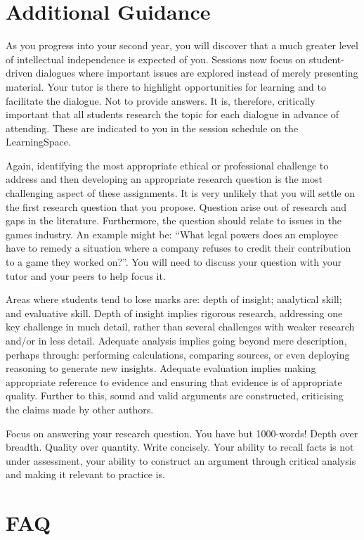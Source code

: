 \documentclass{../fal_assignment}
\begin{document}
\section*{Additional Guidance}

As you progress into your second year, you will discover that a much greater level of intellectual independence is expected of you. Sessions now focus on student-driven dialogues where important issues are explored instead of merely presenting material. Your tutor is there to highlight opportunities for learning and to facilitate the dialogue. Not to provide answers. It is, therefore, critically important that all students research the topic for each dialogue in advance of attending. These are indicated to you in the session schedule on the LearningSpace.

Again, identifying the most appropriate ethical or professional challenge to address and then developing an appropriate research question is the most challenging aspect of these assignments. It is very unlikely that you will settle on the first research question that you propose. Question arise out of research and gaps in the literature. Furthermore, the question should relate to issues in the games industry. An example might be: ``What legal powers does an employee have to remedy a situation where a company refuses to credit their contribution to a game they worked on?''. You will need to discuss your question with your tutor and your peers to help focus it.

Areas where students tend to lose marks are: depth of insight; analytical skill; and evaluative skill. Depth of insight implies rigorous research, addressing one key challenge in much detail, rather than several challenges with weaker research and/or in less detail. Adequate analysis implies going beyond mere description, perhaps through: performing calculations, comparing sources, or even deploying reasoning to generate new insights. Adequate evaluation implies making appropriate reference to evidence and ensuring that evidence is of appropriate quality. Further to this, sound and valid arguments are constructed, criticising the claims made by other authors.

Focus on answering your research question. You have but 1000-words! Depth over breadth. Quality over quantity. Write concisely. Your ability to recall facts is not under assessment, your ability to construct an argument through critical analysis and making it relevant to practice is.

\section*{FAQ}
\end{document}
